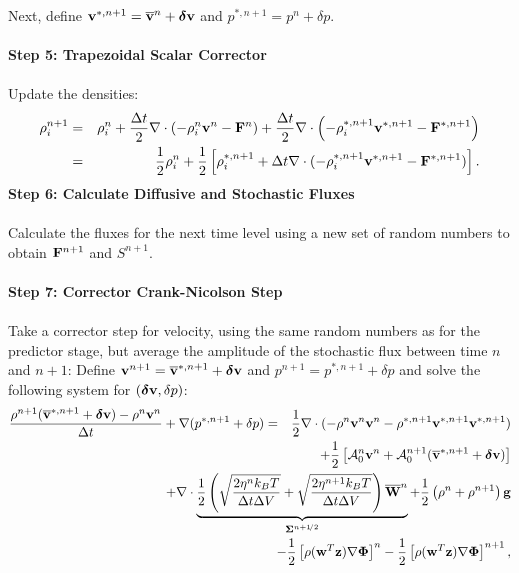 \documentclass[final]{siamltex}
\newcommand{\sfrac}[2]{\mathchoice
  {\kern0em\raise.5ex\hbox{\the\scriptfont0 #1}\kern-.15em/
   \kern-.15em\lower.25ex\hbox{\the\scriptfont0 #2}}
  {\kern0em\raise.5ex\hbox{\the\scriptfont0 #1}\kern-.15em/
   \kern-.15em\lower.25ex\hbox{\the\scriptfont0 #2}}
  {\kern0em\raise.5ex\hbox{\the\scriptscriptfont0 #1}\kern-.2em/
   \kern-.15em\lower.25ex\hbox{\the\scriptscriptfont0 #2}}
  {#1\!/#2}}
\def\Fb {{\bf F}}
\def\gb {{\bf g}}
\def\vb {{\bf v}}
\def\wb {{\bf w}}
\def\Wb {{\bf W}}
\def\zb {{\bf z}}
\def\deltab {\boldsymbol{\delta}}
\def\Phib   {\boldsymbol{\Phi}}
\def\Sigmab {\boldsymbol{\Sigma}}
\def\half   {\frac{1}{2}}
\def\myhalf {\sfrac{1}{2}}
\begin{document}
Next, define $\vb^{*,n+1} = \overline\vb^n + \deltab\vb$ and $p^{*,n+1} = p^n + \delta p$.\\ \\
{\bf Step 5: Trapezoidal Scalar Corrector}\\ \\
Update the densities:
\begin{eqnarray}
\rho_i^{n+1} &=&
\rho_i^n + \frac{\Delta t}{2}\nabla\cdot\left(-\rho_i^n\vb^n - \Fb^n\right) + \frac{\Delta t}{2}\nabla\cdot\left(-\rho_i^{*,n+1}\vb^{*,n+1} - \Fb^{*,n+1}\right)\nonumber\\
&=&  \half\rho_i^n + \half\left[\rho_i^{*,n+1} + \Delta t\nabla\cdot(-\rho_i^{*,n+1}\vb^{*,n+1} - \Fb^{*,n+1})\right].
\end{eqnarray}
{\bf Step 6: Calculate Diffusive and Stochastic Fluxes}\\ \\
Calculate the fluxes for the next time level using a new set of random numbers to obtain $\Fb^{n+1}$ and $S^{n+1}$.\\ \\
{\bf Step 7: Corrector Crank-Nicolson Step}\\ \\
Take a corrector step for velocity, using the same random numbers as for the predictor
stage, but average the amplitude of the stochastic flux between time $n$ and $n+1$:
Define $\vb^{n+1} = \overline\vb^{*,n+1} + \deltab\vb$ and $p^{n+1} = p^{*,n+1} + \delta p$ and
solve the following system for $(\deltab\vb,\delta p)$:
\begin{eqnarray}
\frac{\rho^{n+1}(\overline\vb^{*,n+1} + \deltab\vb) - \rho^n\vb^n}{\Delta t} + \nabla(p^{*,n+1}+\delta p) &=& \half\nabla\cdot(-\rho^n\vb^n\vb^n - \rho^{*,n+1}\vb^{*,n+1}\vb^{*,n+1})\nonumber\\
&&\hspace{-1.5in}+ \half\left[\mathcal{A}_0^n\vb^n + \mathcal{A}_0^{n+1}(\overline\vb^{*,n+1} + \deltab\vb)\right]\nonumber\\
&&\hspace{-1.5in}+ \nabla\cdot\underbrace{\half\left(\sqrt{\frac{2\eta^n k_B T}{\Delta t\Delta V}} + \sqrt{\frac{2\eta^{n+1} k_B T}{\Delta t\Delta V}}\right)\overline\Wb^n}_{\Sigmab^{n+\myhalf}} + \half\left(\rho^n+\rho^{n+1}\right)\gb\nonumber\\
&&\hspace{-1.5in} - \half\left[\rho(\wb^T\zb)\nabla\Phib\right]^n - \half\left[\rho(\wb^T\zb)\nabla\Phib\right]^{n+1},
\end{eqnarray}
\end{document}
